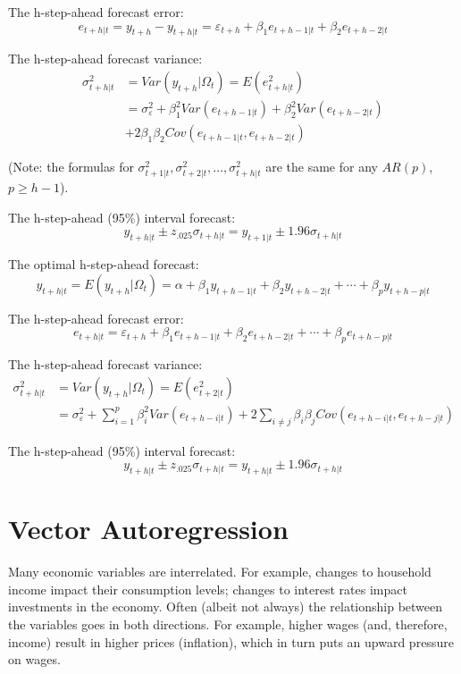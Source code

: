 \documentclass[
  oneside]{book}
\begin{document}
The h-step-ahead forecast error: \[e_{t+h|t} = y_{t+h} - y_{t+h|t} = \varepsilon_{t+h}+\beta_1 e_{t+h-1|t}+\beta_2 e_{t+h-2|t}\]

The h-step-ahead forecast variance:
\[\begin{aligned}
\sigma_{t+h|t}^2 &= Var(y_{t+h}|\Omega_t) = E(e_{t+h|t}^2) \\
&= \sigma_{\varepsilon}^2+\beta_1^2 Var(e_{t+h-1|t})+\beta_2^2 Var(e_{t+h-2|t}) \\
&+2\beta_1\beta_2Cov(e_{t+h-1|t},e_{t+h-2|t})
\end{aligned}\]

(Note: the formulas for \(\sigma_{t+1|t}^2,\sigma_{t+2|t}^2,\ldots,\sigma_{t+h|t}^2\) are the same for any \(AR(p)\), \(p \geq h-1\)).

The h-step-ahead (95\%) interval forecast: \[y_{t+h|t} \pm z_{.025}\sigma_{t+h|t} = y_{t+1|t} \pm 1.96\sigma_{t+h|t}\]

The optimal h-step-ahead forecast: \[y_{t+h|t} = E(y_{t+h}|\Omega_t) = \alpha + \beta_1 y_{t+h-1|t} + \beta_2 y_{t+h-2|t} + \cdots + \beta_p y_{t+h-p|t}\]

The h-step-ahead forecast error: \[e_{t+h|t} = \varepsilon_{t+h} + \beta_1 e_{t+h-1|t} + \beta_2 e_{t+h-2|t} + \cdots + \beta_p e_{t+h-p|t}\]

The h-step-ahead forecast variance:
\[\begin{aligned}
\sigma_{t+h|t}^2 & = Var(y_{t+h}|\Omega_t) = E(e_{t+2|t}^2) \\
&= \sigma_{\varepsilon}^2 + \sum_{i=1}^{p}\beta_i^2 Var(e_{t+h-i|t}) + 2\sum_{i \neq j}\beta_i\beta_j Cov(e_{t+h-i|t},e_{t+h-j|t})
\end{aligned}\]

The h-step-ahead (95\%) interval forecast: \[y_{t+h|t} \pm z_{.025}\sigma_{t+h|t} = y_{t+h|t} \pm 1.96\sigma_{t+h|t}\]

\hypertarget{vector-autoregression}{%
\chapter{Vector Autoregression}\label{vector-autoregression}}

Many economic variables are interrelated. For example, changes to household income impact their consumption levels; changes to interest rates impact investments in the economy. Often (albeit not always) the relationship between the variables goes in both directions. For example, higher wages (and, therefore, income) result in higher prices (inflation), which in turn puts an upward pressure on wages.
\end{document}
